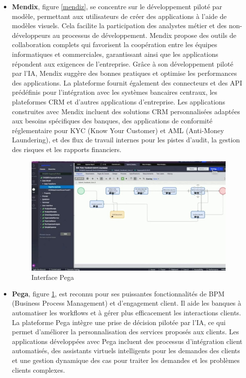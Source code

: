 \begin{itemize}
    \item \textbf{Mendix}, figure \ref*{mendiz}, se concentre sur le développement piloté par modèle, permettant aux utilisateurs de créer des applications à l'aide de modèles visuels. Cela facilite la participation des analystes métier et des non-développeurs au processus de développement. Mendix propose des outils de collaboration complets qui favorisent la coopération entre les équipes informatiques et commerciales, garantissant ainsi que les applications répondent aux exigences de l'entreprise. Grâce à son développement piloté par l'IA, Mendix suggère des bonnes pratiques et optimise les performances des applications. La plateforme fournit également des connecteurs et des API prédéfinis pour l'intégration avec les systèmes bancaires centraux, les plateformes CRM et d'autres applications d'entreprise. Les applications construites avec Mendix incluent des solutions CRM personnalisées adaptées aux besoins spécifiques des banques, des applications de conformité réglementaire pour KYC (Know Your Customer) et AML (Anti-Money Laundering), et des flux de travail internes pour les pistes d'audit, la gestion des risques et les rapports financiers.



          \begin{figure}[H]
              \centering
              \includegraphics[width=15cm]{Figures/pega.jpg}
              \caption{Interface Pega}
              \label{pega} %
          \end{figure}

    \item \textbf{Pega}, figure \ref*{pega}, est reconnu pour ses puissantes fonctionnalités de BPM (Business Process Management) et d'engagement client. Il aide les banques à automatiser les workflows et à gérer plus efficacement les interactions clients. La plateforme Pega intègre une prise de décision pilotée par l'IA, ce qui permet d'améliorer la personnalisation des services proposés aux clients. Les applications développées avec Pega incluent des processus d'intégration client automatisés, des assistants virtuels intelligents pour les demandes des clients et une gestion dynamique des cas pour traiter les demandes et les problèmes clients complexes.



\end{itemize}
